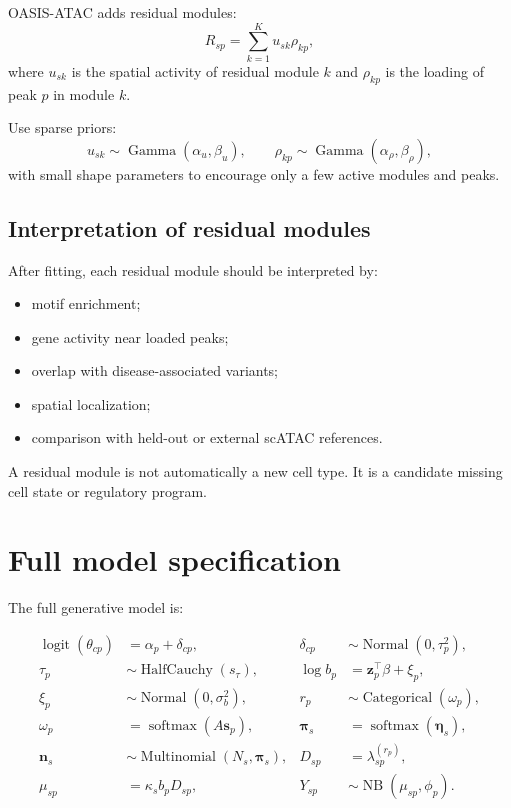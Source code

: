 \documentclass[11pt]{article}
\newcommand{\NB}{\operatorname{NB}}
\newcommand{\Cat}{\operatorname{Categorical}}
\newcommand{\Normal}{\operatorname{Normal}}
\newcommand{\GammaDist}{\operatorname{Gamma}}
\newcommand{\softmax}{\operatorname{softmax}}
\newcommand{\logit}{\operatorname{logit}}
\begin{document}
OASIS-ATAC adds residual modules:
\[
R_{sp}=\sum_{k=1}^{K}u_{sk}\rho_{kp},
\]
where $u_{sk}$ is the spatial activity of residual module $k$ and $\rho_{kp}$ is the loading of peak $p$ in module $k$.

Use sparse priors:
\[
u_{sk}\sim\GammaDist(\alpha_u,\beta_u),
\qquad
\rho_{kp}\sim\GammaDist(\alpha_\rho,\beta_\rho),
\]
with small shape parameters to encourage only a few active modules and peaks.

\subsection{Interpretation of residual modules}

After fitting, each residual module should be interpreted by:
\begin{itemize}
    \item motif enrichment;
    \item gene activity near loaded peaks;
    \item overlap with disease-associated variants;
    \item spatial localization;
    \item comparison with held-out or external scATAC references.
\end{itemize}

A residual module is not automatically a new cell type. It is a candidate missing cell state or regulatory program.

\section{Full model specification}

The full generative model is:

\begin{align}
\logit(\theta_{cp}) &= \alpha_p + \delta_{cp}, &
\delta_{cp} &\sim \Normal(0,\tau_p^2), \\
\tau_p &\sim \operatorname{HalfCauchy}(s_\tau), &
\log b_p &= \mathbf{z}_p^\top\beta+\xi_p, \\
\xi_p&\sim\Normal(0,\sigma_b^2), &
 r_p&\sim\Cat(\omega_p), \\
\omega_p&=\softmax(A\mathbf{s}_p), &
\boldsymbol{\pi}_s&=\softmax(\boldsymbol{\eta}_s), \\
\mathbf{n}_s&\sim\operatorname{Multinomial}(N_s,\boldsymbol{\pi}_s), &
D_{sp}&=\lambda_{sp}^{(r_p)}, \\
\mu_{sp}&=\kappa_s b_p D_{sp}, &
Y_{sp}&\sim\NB(\mu_{sp},\phi_p).
\end{align}
\end{document}
